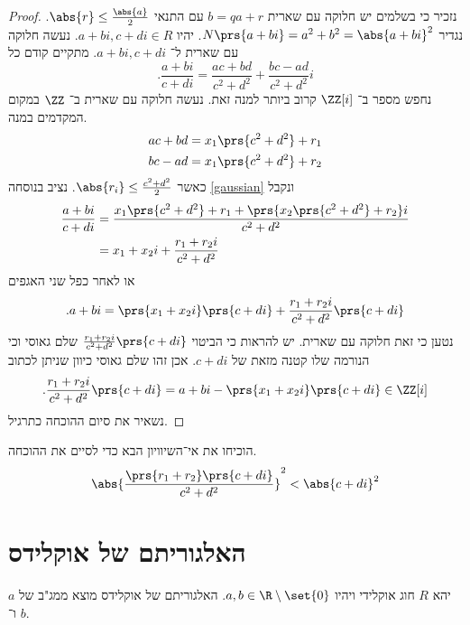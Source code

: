 \documentclass[a4paper,10pt,twoside,openany]{book}
\begin{document}
\begin{proof}
נזכיר כי בשלמים יש חלוקה עם שארית
$b = qa + r$
עם התנאי
$\abs{r} \leq \frac{\abs{a}}{2}$.
נגדיר
$N\prs{a+bi} = a^2 + b^2 = \abs{a+bi}^2$.
יהיו
$a+bi, c+di \in R$.
נעשה חלוקה עם שארית ל־%
$a+bi, c+di$.
מתקיים קודם כל
\begin{equation}\label{gaussian}
\text{.} \frac{a+bi}{c+di} = \frac{ac + bd}{c^2 + d^2} + \frac{bc - ad}{c^2 + d^2}i
\end{equation}
נחפש מספר ב־%
$\ZZ[i]$
קרוב ביותר למנה זאת.
נעשה חלוקה עם שארית ב־%
$\ZZ$
במקום המקדמים במנה.
\begin{align*}
ac + bd &= x_1\prs{c^2 + d^2} + r_1 \\
bc - ad &= x_1\prs{c^2 + d^2}+r_2
\end{align*}
כאשר
$\abs{r_i} \leq \frac{c^2 + d^2}{2}$.
נציב בנוסחה
\ref{gaussian}
ונקבל
\begin{align*}
\frac{a+bi}{c+di} &= \frac{x_1\prs{c^2 + d^2} + r_1 + \prs{x_2\prs{c^2 + d^2} + r_2}i}{c^2 + d^2}\\
&= x_1 + x_2i + \frac{r_1 + r_2 i}{c^2 + d^2}
\end{align*}
או לאחר כפל שני האגפים
\begin{align*}
\text{.} a+bi = \prs{x_1 + x_2i}\prs{c+di}+\frac{r_1 + r_2i}{c^2 + d^2}\prs{c + di}
\end{align*}
נטען כי זאת חלוקה עם שארית. יש להראות כי הביטוי
$\frac{r_1 + r_2 i}{c^2+d^2}\prs{c+di}$
שלם גאוסי וכי הנורמה שלו קטנה מזאת של
$c+di$.
אכן זהו שלם גאוסי כיוון שניתן לכתוב
\[\text{.} \frac{r_1 + r_2i}{c^2 + d^2} \prs{c+di} = a+bi - \prs{x_1 + x_2i}\prs{c+di} \in \ZZ[i]\]
נשאיר את סיום ההוכחה כתרגיל.
\end{proof}
\begin{exercise}
הוכיחו את אי־השיוויון הבא כדי לסיים את ההוכחה.
\[\abs{\frac{\prs{r_1 + r_2}\prs{c+di}}{c^2 + d^2}}^2 < \abs{c+di}^2\]
\end{exercise}
\section{האלגוריתם של אוקלידס}
יהא%
$R$
חוג אוקלידי ויהיו
$a,b \in \R \setminus \set{0}$.
האלגוריתם של אוקלידס מוצא ממג"ב של
$a$
ו־%
$b$.
\end{document}
